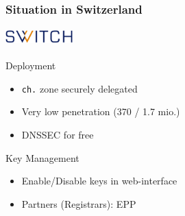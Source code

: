 \documentclass{beamer}
\begin{document}
\begin{frame}
  \frametitle{Situation in Switzerland}
  \framesubtitle{\includegraphics[width=2.6cm]{SWITCH-logo}}

  \begin{block}{Deployment}
    \begin{itemize}
    \item \texttt{ch.} zone securely delegated
    \item Very low penetration (370 / 1.7 mio.)
    \item DNSSEC for free
    \end{itemize}
  \end{block}

  \pause

  \begin{block}{Key Management}
    \begin{itemize}
    \item Enable/Disable keys in web-interface
    \item Partners (Registrars): EPP
    \end{itemize}
  \end{block}
\end{frame}
\end{document}
